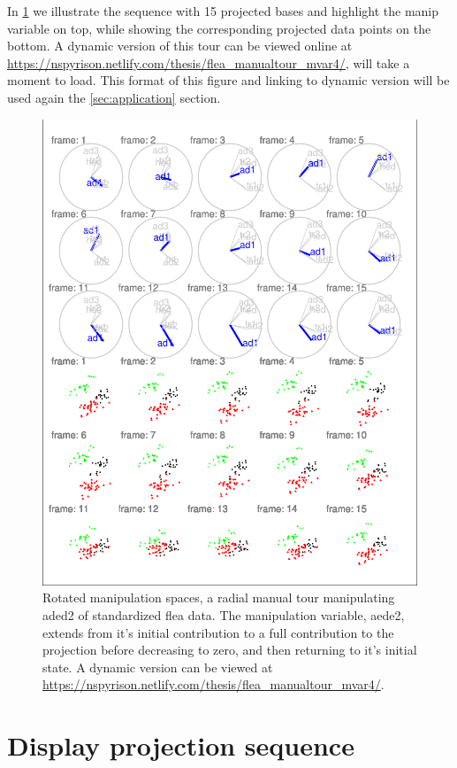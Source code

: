 \documentclass{monashthesis}
\begin{document}
In \ref{fig:step3} we illustrate the sequence with 15 projected bases and highlight the manip variable on top, while showing the corresponding projected data points on the bottom. A dynamic version of this tour can be viewed online at \url{https://nspyrison.netlify.com/thesis/flea_manualtour_mvar4/}, will take a moment to load. This format of this figure and linking to dynamic version will be used again the \ref{sec:application} section.

\begin{figure}
\centering
\includegraphics{thesis_files/figure-latex/step3-1.pdf}
\caption{\label{fig:step3}Rotated manipulation spaces, a radial manual tour manipulating aded2 of standardized flea data. The manipulation variable, aede2, extends from it's initial contribution to a full contribution to the projection before decreasing to zero, and then returning to it's initial state. A dynamic version can be viewed at \url{https://nspyrison.netlify.com/thesis/flea_manualtour_mvar4/}.}
\end{figure}

\hypertarget{display-projection-sequence}{%
\section{Display projection sequence}\label{display-projection-sequence}}
\end{document}
